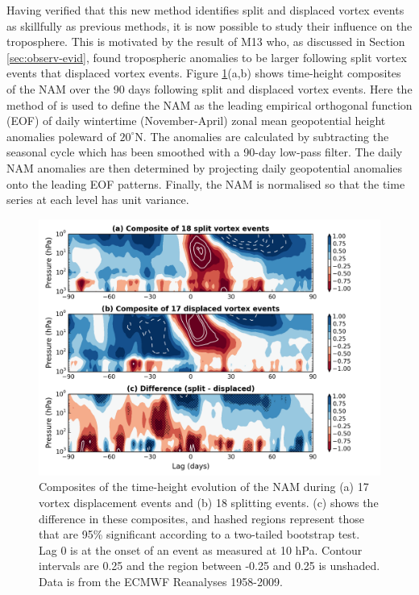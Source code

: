 Having verified that this new method identifies split and displaced vortex
events as skillfully as previous methods, it is now possible to study their
influence on the troposphere. This is motivated by the result of M13 who, as
discussed in Section \ref{sec:observ-evid}, found tropospheric anomalies to be
larger following split vortex events that displaced vortex events. Figure
\ref{fig:dripping_paint}(a,b) shows time-height composites of the NAM over the
90 days following split and displaced vortex events. Here the method of
\citet{Baldwin2009} is used to define the NAM as the leading empirical
orthogonal function (EOF) of daily wintertime (November-April) zonal mean
geopotential height anomalies poleward of $20^{\circ}$N. The anomalies are
calculated by subtracting the seasonal cycle which has been smoothed with a
90-day low-pass filter. The daily NAM anomalies are then determined by
projecting daily geopotential anomalies onto the leading EOF patterns. Finally,
the NAM is normalised so that the time series at each level has unit variance.

\begin{figure}
 \centering
 \noindent\includegraphics[width=\textwidth]{figures/chapter-moments/dripping_paint.png}
 \caption[NAM composites for split and displaced vortex events.]{Composites of
   the time-height evolution of the NAM during (a) 17 vortex displacement events
   and (b) 18 splitting events. (c) shows the difference in these composites,
   and hashed regions represent those that are 95\% significant according to a
   two-tailed bootstrap test. Lag 0 is at the onset of an event as measured at
   10 hPa. Contour intervals are 0.25 and the region between -0.25 and 0.25 is
   unshaded. Data is from the ECMWF Reanalyses 1958-2009.}
 \label{fig:dripping_paint}
\end{figure}


